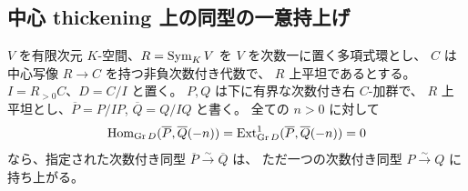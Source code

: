 \subsection{中心 thickening 上の同型の一意持上げ}

\begin{lemma}[正次数中心に沿った次数付き持上げ]
\label{mbcr:lem:graded-lifting}
$V$ を有限次元 $K$-空間、$R=\operatorname{Sym}_K V$ を $V$ を次数一に置く多項式環とし、
$C$ は中心写像 $R\to C$ を持つ非負次数付き代数で、
$R$ 上平坦であるとする。
$I=R_{>0}C$、$D=C/I$ と置く。
$P,Q$ は下に有界な次数付き右 $C$-加群で、
$R$ 上平坦とし、$\overline P=P/IP$, $\overline Q=Q/IQ$ と書く。
全ての $n>0$ に対して
\[
 \operatorname{Hom}_{\operatorname{Gr} D}(\overline P,\overline Q(-n))
 =\operatorname{Ext}^1_{\operatorname{Gr} D}(\overline P,\overline Q(-n))=0
\]
なら、指定された次数付き同型
$\overline P\xrightarrow{\sim}\overline Q$ は、
ただ一つの次数付き同型 $P\xrightarrow{\sim}Q$ に持ち上がる。
\end{lemma}
